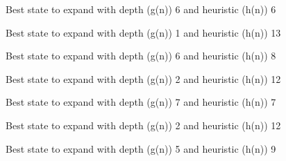 \documentclass{article}
\begin{document}
{\noindent Best state to expand with depth (g(n)) 6 and heuristic (h(n)) 6\newline}
{}\newline

{\noindent Best state to expand with depth (g(n)) 1 and heuristic (h(n)) 13\newline}
{}\newline

{\noindent Best state to expand with depth (g(n)) 6 and heuristic (h(n)) 8\newline}
{}\newline

{\noindent Best state to expand with depth (g(n)) 2 and heuristic (h(n)) 12\newline}
{}\newline

{\noindent Best state to expand with depth (g(n)) 7 and heuristic (h(n)) 7\newline}
{}\newline

{\noindent Best state to expand with depth (g(n)) 2 and heuristic (h(n)) 12\newline}
{}\newline

{\noindent Best state to expand with depth (g(n)) 5 and heuristic (h(n)) 9\newline}
{}\newline
\end{document}
